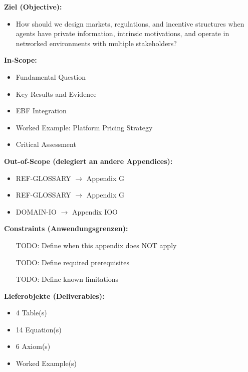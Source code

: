 \begin{tcolorbox}[
    colback=orange!5!white,
    colframe=orange!75!black,
    title={\textbf{Appendix Scope: Ziel / In-Scope / Out-of-Scope / Constraints}},
    fonttitle=\bfseries
]

\textbf{Ziel (Objective):}
\begin{itemize}[nosep]
    \item How should we design markets, regulations, and incentive structures when agents have private information, intrinsic motivations, and operate in networked environments with multiple stakeholders?
\end{itemize}

\textbf{In-Scope:}
\begin{itemize}[nosep]
    \item Fundamental Question
    \item Key Results and Evidence
    \item EBF Integration
    \item Worked Example: Platform Pricing Strategy
    \item Critical Assessment
\end{itemize}

\textbf{Out-of-Scope (delegiert an andere Appendices):}
\begin{itemize}[nosep]
    \item REF-GLOSSARY $\rightarrow$ Appendix G
    \item REF-GLOSSARY $\rightarrow$ Appendix G
    \item DOMAIN-IO $\rightarrow$ Appendix IOO
\end{itemize}

\textbf{Constraints (Anwendungsgrenzen):}
\begin{itemize}[nosep]
    \item [TODO: Define when this appendix does NOT apply]
    \item [TODO: Define required prerequisites]
    \item [TODO: Define known limitations]
\end{itemize}

\textbf{Lieferobjekte (Deliverables):}
\begin{itemize}[nosep]
    \item 4 Table(s)
    \item 14 Equation(s)
    \item 6 Axiom(s)
    \item Worked Example(s)
\end{itemize}

\end{tcolorbox}


